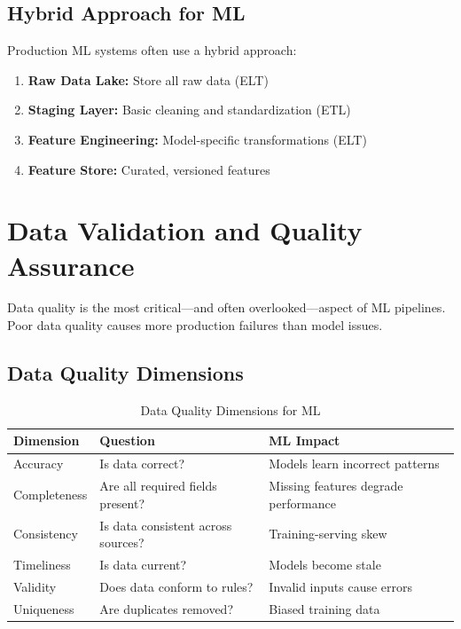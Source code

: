 \subsection{Hybrid Approach for ML}

Production ML systems often use a hybrid approach:

\begin{enumerate}
    \item \textbf{Raw Data Lake:} Store all raw data (ELT)
    \item \textbf{Staging Layer:} Basic cleaning and standardization (ETL)
    \item \textbf{Feature Engineering:} Model-specific transformations (ELT)
    \item \textbf{Feature Store:} Curated, versioned features
\end{enumerate}

\section{Data Validation and Quality Assurance}

Data quality is the most critical—and often overlooked—aspect of ML pipelines. Poor data quality causes more production failures than model issues.

\subsection{Data Quality Dimensions}

\begin{table}[h]
\centering
\caption{Data Quality Dimensions for ML}
\label{tab:data_quality}
\begin{tabular}{@{}llp{6cm}@{}}
\toprule
\textbf{Dimension} & \textbf{Question} & \textbf{ML Impact} \\
\midrule
Accuracy & Is data correct? & Models learn incorrect patterns \\
Completeness & Are all required fields present? & Missing features degrade performance \\
Consistency & Is data consistent across sources? & Training-serving skew \\
Timeliness & Is data current? & Models become stale \\
Validity & Does data conform to rules? & Invalid inputs cause errors \\
Uniqueness & Are duplicates removed? & Biased training data \\
\bottomrule
\end{tabular}
\end{table}

